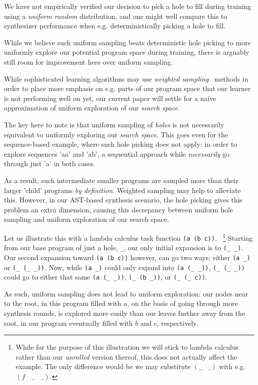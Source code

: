 \documentclass{article}
\begin{document}
We have not empirically verified our decision to pick a hole to fill during training using a \emph{uniform random} distribution,
and one might well compare this to synthesizer performance when e.g. deterministically picking a hole to fill.

While we believe such uniform sampling beats deterministic hole picking to more uniformly explore our potential program space during training,
there is arguably still room for improvement here over uniform sampling.

While sophisticated learning algorithms may use \emph{weighted sampling}~\citep{chen1994weighted}
methods in order to place more emphasis on e.g. parts of our program space that our learner is not performing well on yet,
our current paper will settle for a naive approximation of uniform exploration of our \emph{search space}.

The key here to note is that uniform sampling of \emph{holes} is not necessarily equivalent to uniformly exploring our \emph{search space}.
This goes even for the sequence-based example, where such hole picking does not apply:
in order to explore sequences 'aa' and 'ab',
a sequential approach while \emph{necessarily} go through just 'a' in both cases.

As a result, such intermediate smaller programs are sampled more than their larger 'child' programs \emph{by definition}.
Weighted sampling may help to alleviate this.
However, in our AST-based synthesis scenario,
the hole picking gives this problem an extra dimension,
causing this decrepancy between uniform hole sampling and uniform exploration of our search space.

Let us illustrate this with a lambda calculus task function \verb|(a (b c))|.%
~\footnote{
    While for the purpose of this illustration we will stick to lambda calculus
    rather than our \emph{unrolled} version thereof,
    this does not actually affect the example.
    The only difference would be we may substitute $(\_\quad\_)$ with e.g. $(f\quad\_\quad\_)$.
}
Starting from our base program of just a hole, \verb|_|,
our only initial expansion is to \verb|(_ _)|.
Our second expansion toward \verb|(a (b c))| however,
can go two ways: either \verb|(a _)| or \verb|(_ (_ _))|.
Now, while \verb|(a _)| could only expand into \verb|(a (_ _))|,
\verb|(_ (_ _))| could go to either that same \verb|(a (_ _))|,
\verb|(_ (b _))|, or \verb|(_ (_ c))|.

As such, uniform sampling does not lead to uniform exploration:
our nodes near to the root, in this program filled with $a$,
on the basis of going through more synthesis rounds,
is explored more easily than our leaves further away from the root,
in our program eventually filled with $b$ and $c$, respectively.
\end{document}
